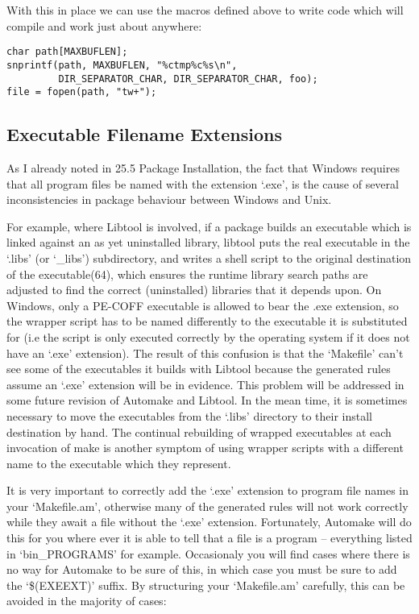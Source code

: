 With this in place we can use the macros defined above to write code which will compile and work just about anywhere:

\begin{verbatim}
char path[MAXBUFLEN];
snprintf(path, MAXBUFLEN, "%ctmp%c%s\n",
         DIR_SEPARATOR_CHAR, DIR_SEPARATOR_CHAR, foo);
file = fopen(path, "tw+");
\end{verbatim}

\subsection{Executable Filename Extensions}

As I already noted in 25.5 Package Installation, the fact that Windows requires that all program files be named with the extension `.exe', is the cause of several inconsistencies in package behaviour between Windows and Unix.

For example, where Libtool is involved, if a package builds an executable which is linked against an as yet uninstalled library, libtool puts the real executable in the `.libs' (or `\_{}libs') subdirectory, and writes a shell script to the original destination of the executable(64), which ensures the runtime library search paths are adjusted to find the correct (uninstalled) libraries that it depends upon. On Windows, only a PE-COFF executable is allowed to bear the .exe extension, so the wrapper script has to be named differently to the executable it is substituted for (i.e the script is only executed correctly by the operating system if it does not have an `.exe' extension). The result of this confusion is that the `Makefile' can't see some of the executables it builds with Libtool because the generated rules assume an `.exe' extension will be in evidence. This problem will be addressed in some future revision of Automake and Libtool. In the mean time, it is sometimes necessary to move the executables from the `.libs' directory to their install destination by hand. The continual rebuilding of wrapped executables at each invocation of make is another symptom of using wrapper scripts with a different name to the executable which they represent.

It is very important to correctly add the `.exe' extension to program file 
names in your `Makefile.am', otherwise many of the generated rules will not 
work correctly while they await a file without the `.exe' extension.
Fortunately, Automake will do this for you where ever it is able to tell that 
a file is a program -- everything listed in `bin\_{}PROGRAMS' for example.
Occasionaly you will find cases where there is no way for Automake to be sure 
of this, in which case you must be sure to add the `\$(EXEEXT)' suffix. By 
structuring your `Makefile.am' carefully, this can be avoided in the majority 
of cases: 

